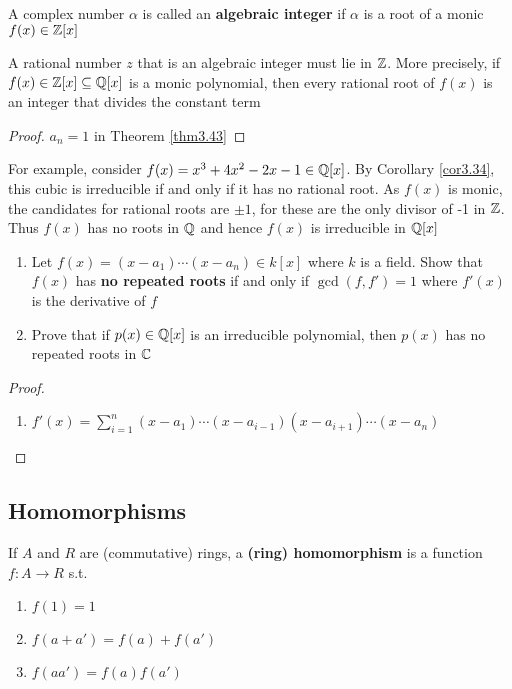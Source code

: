 \documentclass[11pt]{article}
\begin{document}
\begin{definition}[]
A complex number \(\alpha\) is called an \textbf{algebraic integer} if \(\alpha\) is a root of a monic
\(f(x)\in\mathbb{Z}[x]\)
\end{definition}

\begin{corollary}[]
\label{cor3.44}
A rational number \(z\) that is an algebraic integer must lie in \(\mathbb{Z}\). More
precisely, if \(f(x)\in\mathbb{Z}[x]\subseteq\mathbb{Q}[x]\) is a monic polynomial, then
every rational root of \(f(x)\) is an integer that divides the constant term
\end{corollary}

\begin{proof}
\(a_n=1\) in Theorem \ref{thm3.43}
\end{proof}

For example, consider \(f(x)=x^3+4x^2-2x-1\in\mathbb{Q}[x]\). By Corollary
\ref{cor3.34}, this cubic is irreducible if and only if it has no rational
root. As \(f(x)\) is monic, the candidates for rational roots are \(\pm 1\),
for these are the only divisor of -1 in \(\mathbb{Z}\). Thus \(f(x)\) has no roots in
\(\mathbb{Q}\) and hence \(f(x)\) is irreducible in \(\mathbb{Q}[x]\)

\begin{exercise}
\label{ex3.37}
\begin{enumerate}
\item Let \(f(x)=(x-a_1)\cdots(x-a_n)\in k[x]\) where \(k\) is a field. Show that
\(f(x)\) has \textbf{no repeated roots} if and only if \(\gcd(f,f')=1\) where
\(f'(x)\) is the derivative of \(f\)
\item Prove that if \(p(x)\in\mathbb{Q}[x]\) is an irreducible polynomial, then \(p(x)\)
has no repeated roots in \(\mathbb{C}\)
\end{enumerate}
\end{exercise}

\begin{proof}
\begin{enumerate}
\item \(f'(x)=\sum_{i=1}^n(x-a_1)\cdots(x-a_{i-1})(x-a_{i+1})\cdots(x-a_n)\)
\end{enumerate}
\end{proof}
\subsection{Homomorphisms}
\label{sec:orge85ee00}
\begin{definition}[]
If \(A\) and \(R\) are (commutative) rings, a \textbf{(ring) homomorphism} is a function
\(f:A\to R\) s.t.
\begin{enumerate}
\item \(f(1)=1\)
\item \(f(a+a')=f(a)+f(a')\)
\item \(f(aa')=f(a)f(a')\)
\end{enumerate}
\end{definition}
\end{document}
